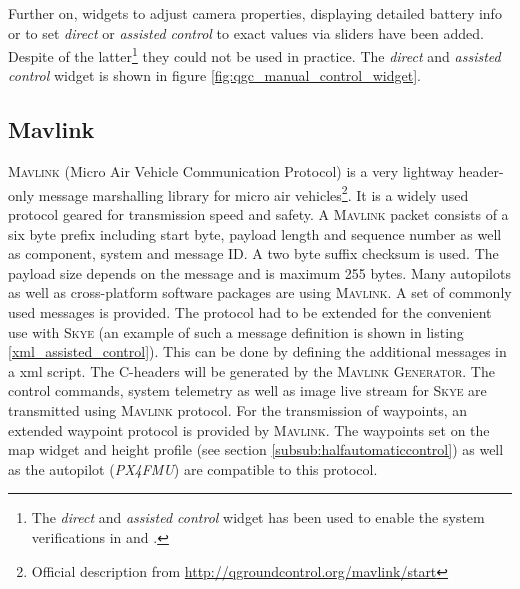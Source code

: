 
Further on, widgets to adjust camera properties, displaying detailed battery info or to set \textit{direct} or \textit{assisted control} to exact values via sliders have been added. Despite of the latter\footnote{The \textit{direct} and \textit{assisted control} widget has been used to enable the system verifications in \cite{meiermueri} and \cite{weichart}.} they could not be used in practice. The \textit{direct} and \textit{assisted control} widget is shown in figure \ref{fig:qgc_manual_control_widget}.

\subsection{Mavlink}
\label{subsec:mavlink}
\textsc{Mavlink} (Micro Air Vehicle Communication Protocol) is a very lightway header-only message marshalling library for micro air vehicles\footnote{Official description from \url{http://qgroundcontrol.org/mavlink/start}}. It is a widely used protocol geared for transmission speed and safety. A \textsc{Mavlink} packet consists of a six byte prefix including start byte, payload length and sequence number as well as component, system and message ID. A two byte suffix checksum is used. The payload size depends on the message and is maximum 255 bytes. Many autopilots as well as cross-platform software packages are using \textsc{Mavlink}.
A set of commonly used messages is provided. The protocol had to be extended for the convenient use with \textsc{Skye} (an example
 of such a message definition is shown in listing \ref{xml_assisted_control}). This can be done by defining the additional messages in a xml script. The C-headers will be generated by the \textsc{Mavlink Generator}. The control commands, system telemetry as well as image live stream for \textsc{Skye} are transmitted using \textsc{Mavlink} protocol. For the transmission of waypoints, an extended waypoint protocol is provided by \textsc{Mavlink}. The waypoints set on the map widget and height profile (see section \ref{subsub:halfautomaticcontrol}) as well as the autopilot (\textit{PX4FMU}) are compatible to this protocol.


